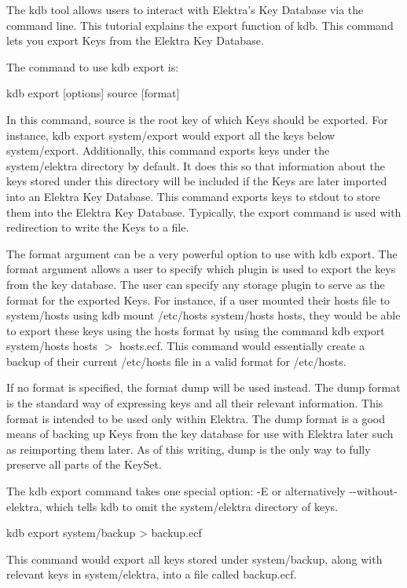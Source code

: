 The kdb tool allows users to interact with Elektra’s Key Database via the command line. This tutorial explains the export function of kdb. This command lets you export Keys from the Elektra Key Database.

The command to use kdb export is\+:


\begin{DoxyCode}
kdb export [options] source [format]
\end{DoxyCode}


In this command, source is the root key of which Keys should be exported. For instance, {\ttfamily kdb export system/export} would export all the keys below {\ttfamily system/export}. Additionally, this command exports keys under the {\ttfamily system/elektra} directory by default. It does this so that information about the keys stored under this directory will be included if the Keys are later imported into an Elektra Key Database. This command exports keys to {\ttfamily stdout} to store them into the Elektra Key Database. Typically, the export command is used with redirection to write the Keys to a file.

The format argument can be a very powerful option to use with kdb export. The format argument allows a user to specify which plugin is used to export the keys from the key database. The user can specify any storage plugin to serve as the format for the exported Keys. For instance, if a user mounted their hosts file to {\ttfamily system/hosts} using {\ttfamily kdb mount /etc/hosts system/hosts hosts}, they would be able to export these keys using the hosts format by using the command {\ttfamily kdb export system/hosts hosts $>$ hosts.\+ecf}. This command would essentially create a backup of their current {\ttfamily /etc/hosts} file in a valid format for {\ttfamily /etc/hosts}.

If no format is specified, the format {\ttfamily dump} will be used instead. The dump format is the standard way of expressing keys and all their relevant information. This format is intended to be used only within Elektra. The dump format is a good means of backing up Keys from the key database for use with Elektra later such as reimporting them later. As of this writing, {\ttfamily dump} is the only way to fully preserve all parts of the {\ttfamily Key\+Set}.

The kdb export command takes one special option\+: {\ttfamily -\/E} or alternatively {\ttfamily -\/-\/without-\/elektra}, which tells {\ttfamily kdb} to omit the {\ttfamily system/elektra} directory of keys.


\begin{DoxyCode}
kdb export system/backup > backup.ecf
\end{DoxyCode}


This command would export all keys stored under {\ttfamily system/backup}, along with relevant keys in {\ttfamily system/elektra}, into a file called {\ttfamily backup.\+ecf}. 